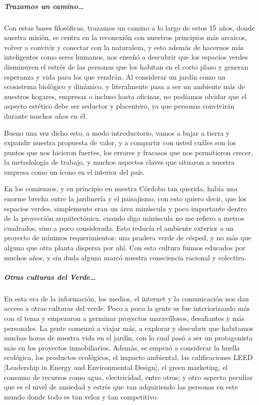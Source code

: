 \documentclass[
]{article}
\begin{document}
\hypertarget{trazamos-un-camino}{%
\subparagraph{Trazamos un camino\ldots{}}\label{trazamos-un-camino}}

Con estas bases filosóficas, trazamos un camino a lo largo de estos 15
años, donde nuestra misión, se centra en la reconexión con nuestros
principios más arcaicos, volver a convivir y conectar con la naturaleza,
y esto además de hacernos más inteligentes como seres humanos, nos
enseñó a descubrir que los espacios verdes disminuyen el estrés de las
personas que los habitan en el corto plazo y generan esperanza y vida
para los que vendrán. Al considerar un jardín como un ecosistema
biológico y dinámico, y literalmente pasa a ser un ambiente más de
nuestros hogares, empresas o incluso hasta oficinas, no podíamos olvidar
que el aspecto estético debe ser seductor y placentero, ya que personas
convivirán durante muchos años en él.

Bueno una vez dicho esto, a modo introductorio, vamos a bajar a tierra y
expandir nuestra propuesta de valor, y a compartir con usted cuáles son
los puntos que nos hicieron fuertes, los errores y fracasos que nos
permitieron crecer, la metodología de trabajo, y muchos aspectos claves
que situaron a nuestra empresa como un ícono en el interior del país.

En los comienzos, y en principio en nuestra Córdoba tan querida, había
una enorme brecha entre la jardinería y el paisajismo, con esto quiero
decir, que los espacios verdes, simplemente eran un área minúscula y
poco importante dentro de la proyección arquitectónica, cuando digo
minúscula no me refiero a metros cuadrados, sino a poco considerada.
Esto reducía el ambiente exterior a un proyecto de mínimos
requerimientos: una pradera verde de césped, y no más que alguna que
otra planta dispersa por ahí. Con esta cultura fuimos educados por
muchos años, y sin duda alguna marcó nuestra consciencia racional y
colectiva.

\hypertarget{otras-culturas-del-verde}{%
\subparagraph{Otras culturas del
Verde\ldots{}}\label{otras-culturas-del-verde}}

En esta era de la información, los medios, el internet y la comunicación
nos dan acceso a otras culturas del verde. Poco a poco la gente se fue
interiorizando más con el tema y empezaron a germinar proyectos
maravillosos, desafiantes y más personales. La gente comenzó a viajar
más, a explorar y descubrir que habitamos muchas horas de nuestra vida
en el jardín, con lo cual pasó a ser un protagonista más en los
proyectos inmobiliarios. Además, se empezó a considerar la huella
ecológica, los productos ecológicos, el impacto ambiental, las
calificaciones LEED {[}Leadership in Energy and Environmental Design{]},
el green marketing, el consumo de recursos como agua, electricidad,
entre otros; y otro aspecto peculiar que es el nivel de ansiedad y
estrés que van adquiriendo las personas en este mundo donde todo es tan
veloz y tan competitivo.
\end{document}
